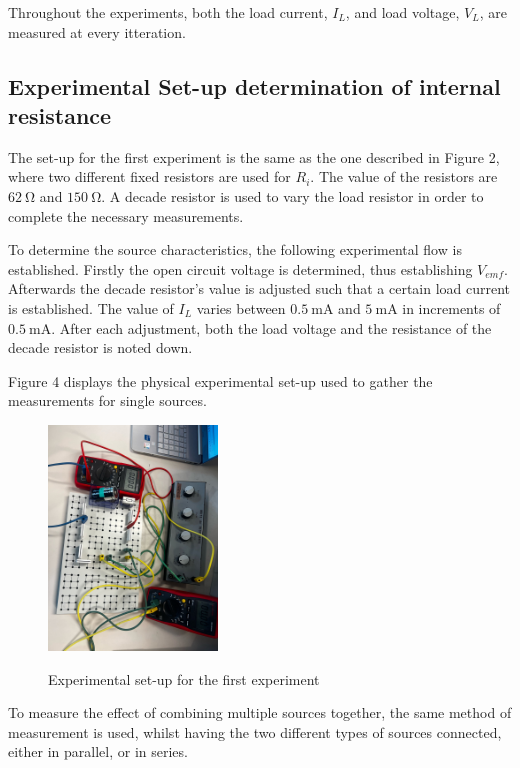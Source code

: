 \documentclass[a4paper]{article}
\newcommand{\unit}[1]{~\mathrm{#1}}
\begin{document}
Throughout the experiments, both the load current, $I_L$, and load voltage,
$V_L$, are measured at every itteration.

\subsection{Experimental Set-up determination of internal resistance}
The set-up for the first experiment is the same as the one described in Figure
2, where two different fixed resistors are used for $R_i$. The value of the
resistors are $62\unit{\Omega}$ and $150\unit{\Omega}$. A decade resistor is
used to vary the load resistor in order to complete the necessary measurements.

To determine the source characteristics, the following experimental flow is
established. Firstly the open circuit voltage is determined, thus establishing
$V_{emf}$. Afterwards the decade resistor's value is adjusted such that a
certain load current is established. The value of $I_L$ varies between
$0.5\unit{mA}$ and $5\unit{mA}$ in increments of $0.5\unit{mA}$. After each
adjustment, both the load voltage and the resistance of the decade resistor is
noted down.

Figure 4 displays the physical experimental set-up used to gather the
measurements for single sources. 

\begin{figure}[!ht]
    \centering
    \includegraphics[width = 0.4\textwidth, angle = 90]{firstexp.jpeg}
    \label{fig:4}
    \caption{Experimental set-up for the first experiment}
\end{figure}

To measure the effect of combining multiple sources together, the same method
of measurement is used, whilst having the two different types of sources
connected, either in parallel, or in series. 
\end{document}
